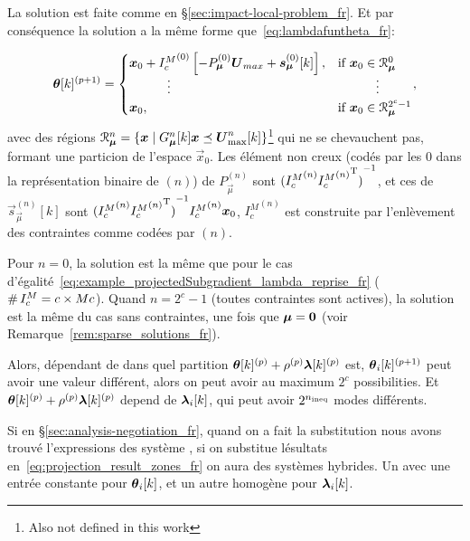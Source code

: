 \documentclass[../main.tex]{subfiles}
\begin{document}
La solution est faite comme en \S\ref{sec:impact-local-problem_fr}.
Et par conséquence la solution a la même forme \pwa{} que~\eqref{eq:lambdafuntheta_fr}:

\begin{equation}
  \label{eq:projection_result_zones_fr}
  \begin{aligned}
    \vec{\theta}[k]\pplusone=
    \begin{cases}
      \vec{x}_{0}+
      {I_{c}^{M}}^{(0)}\left[-P_{\vec{\mu}}^{(0)}\vec{U}_{max}+\vec{s}_{\vec{\mu}}^{(0)}[k]\right],&\text{if}\ \vec{x}_{0}\in\set{R}_{\vec{\mu}}^{0}\\
      \qquad\quad \vdots&\qquad\quad \vdots\\
      \vec{x}_{0},&\text{if}\ \vec{x}_{0}\in\set{R}_{\vec{\mu}}^{2^{c}-1}\\
    \end{cases}
  \end{aligned},
\end{equation}
avec des régions ${\mathcal{R}_{\boldsymbol{\mu}}^{n}=\{\boldsymbol{x}\mid G_{\boldsymbol{\mu}}^{n}[k]\boldsymbol{x} \preceq \boldsymbol{U}_{\max}^{n}[k]\}}$\footnote{Also not defined in this work} qui ne se chevauchent pas, formant une particion de l'espace $\vec{x}_{0}$.
Les élément non creux (codés par les $0$ dans la représentation binaire de $(n)$) de $P_{\vec{\mu}}^{(n)}$ sont ${({I_{c}^{M}}^{(n)}{{I_{c}^{M}}^{(n)}}^{\mathrm{T}})}^{-1}$, et ces de $\vec{s}_{\vec{\mu}}^{(n)}[k]$ sont ${{({I_{c}^{M}}^{(n)}{{I_{c}^{M}}^{(n)}}^{\mathrm{T}})}^{-1}{I_{c}^{M}}^{(n)}\boldsymbol{x}_{0}}$, ${I_{c}^{M}}^{(n)}$ est construite par l'enlèvement des contraintes comme codées par $(n)$.

Pour $n=0$, la solution est la même que pour le cas d'égalité~\eqref{eq:example_projectedSubgradient_lambda_reprise_fr} ($\operatorname{\#}{I_{c}^{M}}=c\times Mc$).
Quand $n=2^{c}-1$ (toutes contraintes sont actives), la solution est la même du cas sans contraintes, une fois que $\boldsymbol{\mu}=\mathbf{0}$ (voir Remarque~\ref{rem:sparse_solutions_fr}).

Alors, dépendant de dans quel partition $\boldsymbol{\theta}[k]^{(p)}+\rho^{(p)}\boldsymbol{\lambda}[k]^{(p)}$ est,
$\thetaik\pplusone$ peut avoir une valeur différent, alors on peut avoir au maximum $2^{c}$ possibilities.
Et $\boldsymbol{\theta}[k]^{(p)}+\rho^{(p)}\boldsymbol{\lambda}[k]^{(p)}$ depend de $\lambdaik$, qui peut avoir $2^{n_{\text{ineq}}}$ modes différents.

Si en \S\ref{sec:analysis-negotiation_fr}, quand on a fait la substitution nous avons trouvé l'expressions des système \dt{}, si on substitue lésultats en~\eqref{eq:projection_result_zones_fr} on aura des systèmes \dt{} hybrides.
Un avec une entrée constante pour $\thetaik$, et un autre homogène pour $\lambdaik$.
\end{document}
